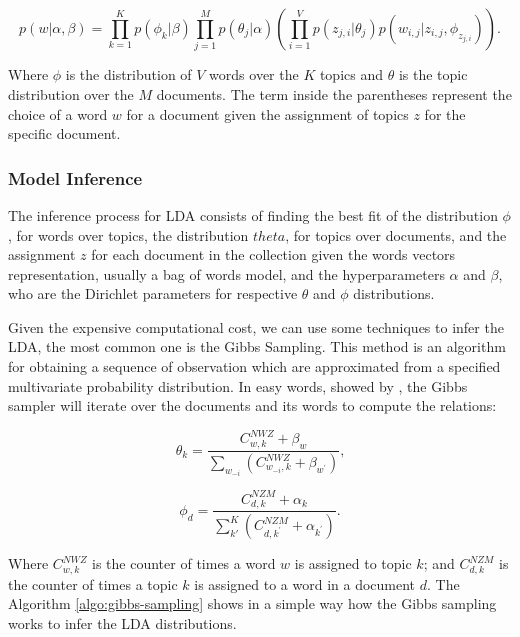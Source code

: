 	\begin{equation}
		\label{eq:generative-lda}
		p(w|\alpha, \beta) = \prod_{k=1}^{K} p(\phi_{k}|\beta) \prod_{j=1}^{M} p(\theta_{j}|\alpha) \left( \prod_{i=1}^{V}p(z_{j,i}|\theta_{j}) p(w_{i,j}|z_{i,j},\phi_{z_{j,i}})  \right) \text{.}
	\end{equation}

	Where $\phi$ is the distribution of $V$ words over the $K$ topics and $\theta$ is the topic distribution over the $M$ documents. The term inside the parentheses represent the choice of a word $w$ for a document given the assignment of topics $z$ for the specific document.
	
	\subsubsection{Model Inference}
	
	The inference process for LDA consists of finding the best fit of the distribution $\phi$, for words over topics, the distribution $theta$, for topics over documents, and the assignment $z$ for each document in the collection given the words vectors representation, usually a bag of words model, and the hyperparameters $\alpha$ and $\beta$, who are the Dirichlet parameters for respective $\theta$ and $\phi$ distributions.
	
	Given the expensive computational cost, we can use some techniques to infer the LDA, the most common one is the Gibbs Sampling. This method is an algorithm for obtaining a sequence of observation which are approximated from a specified multivariate probability distribution. In easy words, showed by , the Gibbs sampler will iterate over the documents and its words to compute the relations:

	\begin{equation}
		\label{eq:theta-dist}
		\theta_{k} = \frac{C_{w,k}^{NWZ} + \beta_{w}} {\sum_{w_{-i}} \left(C_{w_{-i},k}^{NWZ} + \beta_{w^{'}} \right)} \text{,}
	\end{equation}
	
	\begin{equation}
		\label{eq:phi-dist}
		\phi_{d} = \frac{C_{d,k}^{NZM} + \alpha_{k}} {\sum_{k'}^{K} \left(C_{d,k^{'}}^{NZM} + \alpha_{k^{'}} \right)} \text{.}
	\end{equation}

	Where $C_{w,k}^{NWZ}$ is the counter of times a word $w$ is assigned to topic $k$; and $C_{d,k}^{NZM}$ is the counter of times a topic $k$ is assigned to a word in a document $d$. The Algorithm \ref{algo:gibbs-sampling} shows in a simple way how the Gibbs sampling works to infer the LDA distributions.
	
